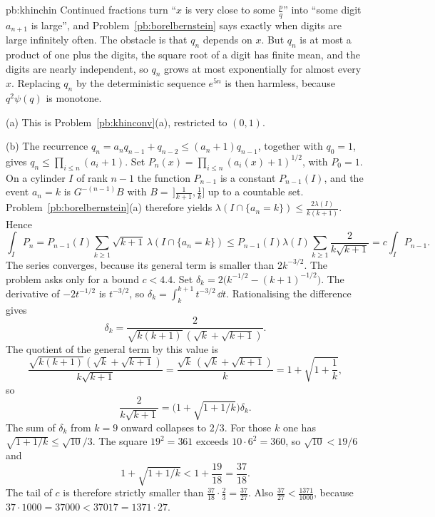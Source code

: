 \begin{solution}{pb:khinchin}
\idea Continued fractions turn ``$x$ is very close to some $\frac pq$'' into ``some digit $a_{n+1}$ is large'', and Problem~\ref{pb:borelbernstein} says exactly when digits are large infinitely often. The obstacle is that $q_n$ depends on $x$. But $q_n$ is at most a product of one plus the digits, the square root of a digit has finite mean, and the digits are nearly independent, so $q_n$ grows at most exponentially for almost every $x$. Replacing $q_n$ by the deterministic sequence $e^{5n}$ is then harmless, because $q^2\psi(q)$ is monotone.

\writeup (a) This is Problem~\ref{pb:khinconv}(a), restricted to $(0,1)$.

(b) The recurrence $q_n=a_nq_{n-1}+q_{n-2}\le(a_n+1)q_{n-1}$, together with $q_0=1$, gives $q_n\le\prod_{i\le n}(a_i+1)$. Set $P_n(x)=\prod_{i\le n}(a_i(x)+1)^{1/2}$, with $P_0=1$. On a cylinder $I$ of rank $n-1$ the function $P_{n-1}$ is a constant $P_{n-1}(I)$, and the event $a_n=k$ is $G^{-(n-1)}B$ with $B=\,]\frac1{k+1},\frac1k]$ up to a countable set. Problem~\ref{pb:borelbernstein}(a) therefore yields $\lambda(I\cap\{a_n=k\})\le\frac{2\lambda(I)}{k(k+1)}$. Hence
\[
\int_IP_n=P_{n-1}(I)\sum_{k\ge1}\sqrt{k+1}\,\lambda(I\cap\{a_n=k\})\le P_{n-1}(I)\lambda(I)\sum_{k\ge1}\frac2{k\sqrt{k+1}}=c\int_IP_{n-1}.
\]
The series converges, because its general term is smaller than $2k^{-3/2}$. The problem asks only for a bound $c<4.4$. Set $\delta_k=2\bigl(k^{-1/2}-(k+1)^{-1/2}\bigr)$. The derivative of $-2t^{-1/2}$ is $t^{-3/2}$, so $\delta_k=\int_k^{k+1}t^{-3/2}\,\dd t$. Rationalising the difference gives
\[
\delta_k=\frac{2}{\sqrt{k(k+1)}\,(\sqrt k+\sqrt{k+1})}.
\]
The quotient of the general term by this value is
\[
\frac{\sqrt{k(k+1)}(\sqrt k+\sqrt{k+1})}{k\sqrt{k+1}}=\frac{\sqrt k\,(\sqrt k+\sqrt{k+1})}{k}=1+\sqrt{1+\frac1k},
\]
so
\[
\frac{2}{k\sqrt{k+1}}=\bigl(1+\sqrt{1+1/k}\bigr)\delta_k.
\]
The sum of $\delta_k$ from $k=9$ onward collapses to $2/3$. For those $k$ one has $\sqrt{1+1/k}\le\sqrt{10}/3$. The square $19^2=361$ exceeds $10\cdot6^2=360$, so $\sqrt{10}<19/6$ and
\[
1+\sqrt{1+1/k}<1+\frac{19}{18}=\frac{37}{18}.
\]
The tail of $c$ is therefore strictly smaller than $\frac{37}{18}\cdot\frac23=\frac{37}{27}$. Also $\frac{37}{27}<\frac{1371}{1000}$, because $37\cdot1000=37000<37017=1371\cdot27$.


\end{solution}
